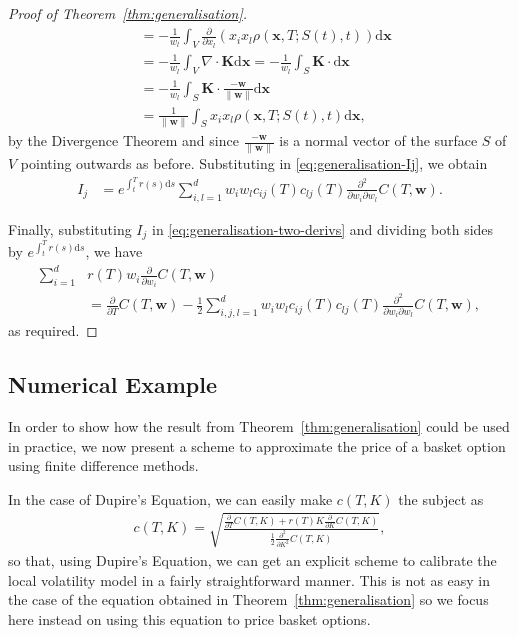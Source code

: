 \documentclass[english]{article}
\numberwithin{equation}{section}
\numberwithin{figure}{section}
\theoremstyle{bolddescit}
\theoremstyle{definition}
\theoremstyle{definition}
\theoremstyle{plain}
\theoremstyle{plain}
\theoremstyle{bolddesc}
\theoremstyle{plain}
\theoremstyle{remark}
\begin{document}
\begin{proof}[Proof of Theorem~\ref{thm:generalisation}]
\begin{align*}
    &= -\frac{1}{w_l} \int_V \frac{\partial}{\partial x_l} \left(x_i x_l \rho(\mathbf{x},T;S(t),t)\right) \mathrm{d}\mathbf{x}\\
    &= -\frac{1}{w_l} \int_V \nabla \cdot \mathbf{K} \mathrm{d}\mathbf{x}
    = -\frac{1}{w_l} \int_S \mathbf{K} \cdot \mathrm{d}\mathbf{x}\\
    &= -\frac{1}{w_l} \int_S \mathbf{K} \cdot \frac{-\mathbf{w}}{\|\mathbf{w}\|} \mathrm{d}\mathbf{x}\\
    &= \frac{1}{\|\mathbf{w}\|} \int_S x_i x_l \rho(\mathbf{x},T;S(t),t) \mathrm{d}\mathbf{x},
  \end{align*}
  by the Divergence Theorem and since $\frac{-\mathbf{w}}{\|\mathbf{w}\|}$ is a normal vector of the surface $S$ of $V$ pointing outwards as before. Substituting in \eqref{eq:generalisation-Ij}, we obtain
  \begin{align*}
    I_j
    &= e^{\int_t^T r(s) \mathrm{d}s} \sum_{i,l=1}^{d} w_i w_l c_{ij}(T) c_{lj}(T) \frac{\partial^2}{\partial w_i \partial w_l} C(T,\mathbf{w}).
  \end{align*}

  Finally, substituting $I_j$ in \eqref{eq:generalisation-two-derivs} and dividing both sides by $e^{\int_t^T r(s) \mathrm{d}s}$, we have
  \begin{align*}
    \sum_{i=1}^{d} &r(T) w_i \frac{\partial}{\partial w_i} C(T,\mathbf{w})\\
    &= \frac{\partial}{\partial T} C(T,\mathbf{w}) - \frac{1}{2} \sum_{i,j,l=1}^{d} w_i w_l c_{ij}(T) c_{lj}(T) \frac{\partial^2}{\partial w_i \partial w_l} C(T,\mathbf{w}),
  \end{align*}
  as required.
\end{proof}

\subsection{Numerical Example}

In order to show how the result from Theorem~\ref{thm:generalisation} could be used in practice, we now present a scheme to approximate the price of a basket option using finite difference methods.

In the case of Dupire's Equation, we can easily make $c(T,K)$ the subject as
\begin{align}
  c(T,K) = \sqrt{\frac{\frac{\partial}{\partial T} C(T,K) + r(T) K \frac{\partial}{\partial K} C(T,K)}{\frac{1}{2}\frac{\partial^2}{\partial K^2} C(T,K)}},\label{eq:dupire-calibration}
\end{align}
so that, using Dupire's Equation, we can get an explicit scheme to calibrate the local volatility model in a fairly straightforward manner. This is not as easy in the case of the equation obtained in Theorem~\ref{thm:generalisation} so we focus here instead on using this equation to price basket options.
\end{document}
